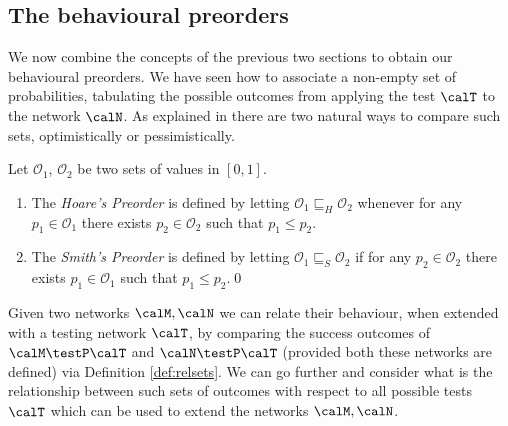 \documentclass{LMCS}
\begin{document}
\subsection{The behavioural preorders}
\label{sec:maypreord}

We now combine the concepts of the previous two sections to obtain our behavioural preorders.
We have seen how to associate a non-empty set of probabilities, tabulating 
the possible outcomes from applying the test $\calT$ to the network $\calN$. 
As explained in \cite{DGHM09full}
there are two natural ways to compare such sets, optimistically or pessimistically. 

\begin{defi}
\label{def:relsets}
Let ${\mathcal O}_1$, ${\mathcal O}_2$ be two sets of values in 
$[0,1]$.
\begin{enumerate}[label=(\roman*)]
\item The \emph{Hoare's Preorder} is defined by letting 
${\mathcal O}_1 \sqsubseteq_{H} {\mathcal O}_2$ whenever 
for any $p_1 \in {\mathcal O}_1$ there exists $p_2 \in {\mathcal O}_2$ 
such that $p_1 \leq p_2$.
\item The \emph{Smith's Preorder} is defined by letting 
${\mathcal O}_1 \sqsubseteq_{S} {\mathcal O}_2$ if 
for any $p_2 \in {\mathcal O}_2$ there exists $p_1 \in {\mathcal O}_1$ 
such that $p_1 \leq p_2$.\qed
\end{enumerate}
\end{defi}
\noindent Given two networks $\calM, \calN$ we can relate their behaviour, 
when extended with a testing network $\calT$, by comparing the success 
outcomes of $\calM \testP \calT$ and $\calN \testP \calT$ (provided both these 
networks are defined) via Definition \ref{def:relsets}. 
We can go further and consider what is the relationship between such sets of 
outcomes with respect to all possible tests $\calT$ which can be used 
to extend the networks $\calM, \calN$.
 
\end{document}

